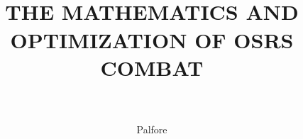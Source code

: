 \documentclass[12pt,a4paper]{article}
\author{Palfore}
\title{
	\HRule{0.5pt}\\
	\LARGE \textbf{\uppercase{The Mathematics and Optimization of OSRS Combat}}\\
	\HRule{2pt}\\
}
\begin{document}
\begin{titlepage}
	\maketitle
\end{titlepage}
\end{document}
